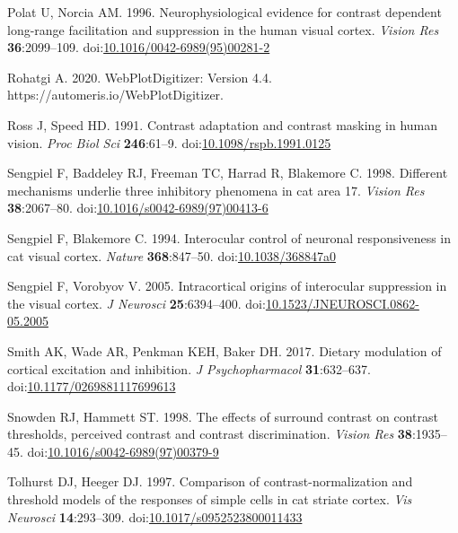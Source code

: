 \documentclass[]{article}
\begin{document}
\leavevmode\hypertarget{ref-Polat1996}{}%
Polat U, Norcia AM. 1996. Neurophysiological evidence for contrast dependent long-range facilitation and suppression in the human visual cortex. \emph{Vision Res} \textbf{36}:2099--109. doi:\href{https://doi.org/10.1016/0042-6989(95)00281-2}{10.1016/0042-6989(95)00281-2}

\leavevmode\hypertarget{ref-Rohatgi2020}{}%
Rohatgi A. 2020. WebPlotDigitizer: Version 4.4. https://automeris.io/WebPlotDigitizer.

\leavevmode\hypertarget{ref-Ross1991}{}%
Ross J, Speed HD. 1991. Contrast adaptation and contrast masking in human vision. \emph{Proc Biol Sci} \textbf{246}:61--9. doi:\href{https://doi.org/10.1098/rspb.1991.0125}{10.1098/rspb.1991.0125}

\leavevmode\hypertarget{ref-Sengpiel1998}{}%
Sengpiel F, Baddeley RJ, Freeman TC, Harrad R, Blakemore C. 1998. Different mechanisms underlie three inhibitory phenomena in cat area 17. \emph{Vision Res} \textbf{38}:2067--80. doi:\href{https://doi.org/10.1016/s0042-6989(97)00413-6}{10.1016/s0042-6989(97)00413-6}

\leavevmode\hypertarget{ref-Sengpiel1994}{}%
Sengpiel F, Blakemore C. 1994. Interocular control of neuronal responsiveness in cat visual cortex. \emph{Nature} \textbf{368}:847--50. doi:\href{https://doi.org/10.1038/368847a0}{10.1038/368847a0}

\leavevmode\hypertarget{ref-Sengpiel2005}{}%
Sengpiel F, Vorobyov V. 2005. Intracortical origins of interocular suppression in the visual cortex. \emph{J Neurosci} \textbf{25}:6394--400. doi:\href{https://doi.org/10.1523/JNEUROSCI.0862-05.2005}{10.1523/JNEUROSCI.0862-05.2005}

\leavevmode\hypertarget{ref-Smith2017}{}%
Smith AK, Wade AR, Penkman KEH, Baker DH. 2017. Dietary modulation of cortical excitation and inhibition. \emph{J Psychopharmacol} \textbf{31}:632--637. doi:\href{https://doi.org/10.1177/0269881117699613}{10.1177/0269881117699613}

\leavevmode\hypertarget{ref-Snowden1998}{}%
Snowden RJ, Hammett ST. 1998. The effects of surround contrast on contrast thresholds, perceived contrast and contrast discrimination. \emph{Vision Res} \textbf{38}:1935--45. doi:\href{https://doi.org/10.1016/s0042-6989(97)00379-9}{10.1016/s0042-6989(97)00379-9}

\leavevmode\hypertarget{ref-Tolhurst1997}{}%
Tolhurst DJ, Heeger DJ. 1997. Comparison of contrast-normalization and threshold models of the responses of simple cells in cat striate cortex. \emph{Vis Neurosci} \textbf{14}:293--309. doi:\href{https://doi.org/10.1017/s0952523800011433}{10.1017/s0952523800011433}
\end{document}
